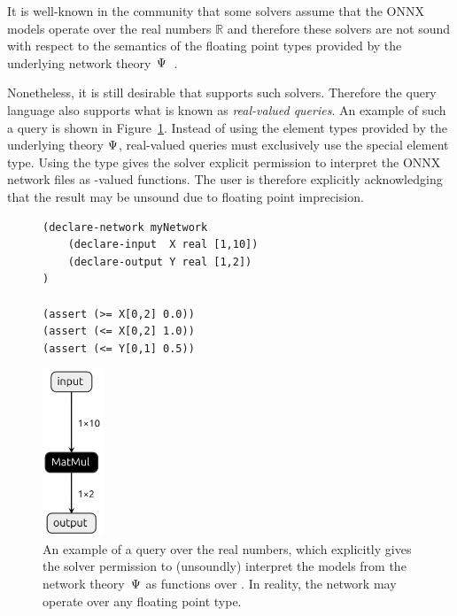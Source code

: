 It is well-known in the community that some solvers assume that the ONNX models operate over the real numbers $\mathbb{R}$ and therefore these solvers are not sound with respect to the semantics of the floating point types provided by the underlying network theory~$\Psi$~\cite{jia2021exploiting}. 

Nonetheless, it is still desirable that \vnnlib{} supports such solvers. Therefore the \vnnlib{} query language also supports what is known as \emph{real-valued queries}. An example of such a query is shown in Figure~\ref{fig:real-simple-query}. Instead of using the element types provided by the underlying theory $\Psi$, real-valued queries must exclusively use the special  element type. 
Using the  type gives the solver explicit permission to interpret the ONNX network files as \real{}-valued functions. The user is therefore explicitly acknowledging that the result may be unsound due to floating point imprecision. 

\begin{figure}[t]
    \begin{minipage}[c]{0.62\textwidth}
        \begin{lstlisting}[style=lbnf]
(declare-network myNetwork
    (declare-input  X real [1,10])
    (declare-output Y real [1,2])
)

(assert (>= X[0,2] 0.0))
(assert (<= X[0,2] 1.0))
(assert (<= Y[0,1] 0.5))\end{lstlisting}
    \end{minipage}%
    \begin{minipage}[c]{0.35\textwidth}
        \centering
        \includegraphics[height=5cm]{imgs/simple_net.onnx.png}
    \end{minipage}
    \caption{An example of a \vnnlib{} query over the real numbers, which explicitly gives the solver permission to (unsoundly) interpret the models from the network theory~$\Psi$ as functions over \real. In reality, the network may operate over any floating point type.}
    \label{fig:real-simple-query}
\end{figure}

